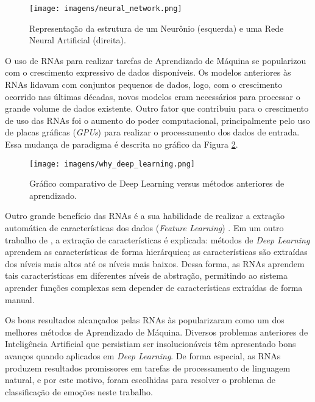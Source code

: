 \documentclass[
12pt,				%
openright,			%
oneside,			%
a4paper,			%
english,			%
french,				%
spanish,			%
brazil				%
]{abntex2}
\begin{document}
\begin{figure}[ht]
\centering
\caption{Representação da estrutura de um Neurônio (esquerda) e uma Rede Neural Artificial (direita).}
\texttt{[image: imagens/neural\_network.png]}
\label{fig:neural_network}
\end{figure}

O uso de RNAs para realizar tarefas de Aprendizado de Máquina se popularizou com o crescimento expressivo de dados disponíveis. Os modelos anteriores às RNAs lidavam com conjuntos pequenos de dados, logo, com o crescimento ocorrido nas últimas décadas, novos modelos eram necessários para processar o grande volume de dados existente. Outro fator que contribuiu para o crescimento de uso das RNAs foi o aumento do poder computacional, principalmente pelo uso de placas gráficas (\textit{GPUs}) para realizar o processamento dos dados de entrada. Essa mudança de paradigma é descrita no gráfico da Figura \ref{fig:why_deep_learning}.

\begin{figure}[ht]
\centering
\caption{Gráfico comparativo de Deep Learning versus métodos anteriores de aprendizado.}
\texttt{[image: imagens/why\_deep\_learning.png]}
\label{fig:why_deep_learning}
\end{figure}

Outro grande benefício das RNAs é a sua habilidade de realizar a extração automática de características dos dados (\textit{Feature Learning}) \cite{bengio2012deep}. Em um outro trabalho de , a extração de características é explicada: métodos de \textit{Deep Learning} aprendem as características de forma hierárquica; as características são extraídas dos níveis mais altos até os níveis mais baixos. Dessa forma, as RNAs aprendem tais características em diferentes níveis de abstração, permitindo ao sistema aprender funções complexas sem depender de características extraídas de forma manual. 

Os bons resultados alcançados pelas RNAs às popularizaram como um dos melhores métodos de Aprendizado de Máquina. Diversos problemas anteriores de Inteligência Artificial que persistiam ser insolucionáveis têm apresentado bons avanços quando aplicados em \textit{Deep Learning}. De forma especial, as RNAs produzem resultados promissores em tarefas de processamento de linguagem natural, e por este motivo, foram escolhidas para resolver o problema de classificação de emoções neste trabalho.
\end{document}
